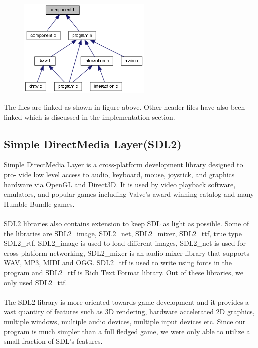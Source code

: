 \documentclass[report.tex]{subfiles}
\begin{document}
    \begin{figure}[H]
        \centering
        \includegraphics[width=2.5in]{graphics/component_8h__dep__incl.png}
    \end{figure}
    The files are linked as shown in figure above. Other header files have also been linked which is discussed in the implementation section.
    \subsection{Simple DirectMedia Layer(SDL2)}
    Simple DirectMedia Layer is a cross-platform development library designed to pro-
    vide low level access to audio, keyboard, mouse, joystick, and graphics hardware
    via OpenGL and Direct3D. It is used by video playback software, emulators, and
    popular games including Valve’s award winning catalog and many Humble Bundle
    games.\\\\
    SDL2 libraries also contains extension to keep SDL as light as possible. Some of the
    libraries are SDL2\_image, SDL2\_net, SDL2\_mixer, SDL2\_ttf, true type SDL2\_rtf. SDL2\_image
    is used to load different images, SDL2\_net is used for cross platform networking,
    SDL2\_mixer is an audio mixer library that supports WAV, MP3, MIDI and OGG.
    SDL2\_ttf is used to write using fonts in the program and SDL2\_rtf is Rich Text Format
    library. Out of these libraries, we only used SDL2\_ttf.
    \\\\
    The SDL2 library is more oriented towards game development and it provides a vast quantity of features such as 3D rendering, hardware accelerated 2D graphics, multiple windows, multiple audio devices, multiple input devices etc. 
    Since our program is much simpler than a full fledged game, we were only able to utilize a small fraction of SDL's features.
\end{document}
